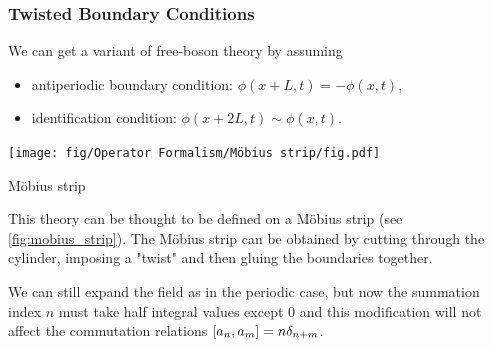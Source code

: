 \documentclass[10pt]{article}
\begin{document}
\subsubsection{Twisted Boundary Conditions}
We can get a variant of free-boson theory by assuming 
\begin{itemize}
    \item antiperiodic boundary condition: $\phi(x+L,t)=-\phi(x,t)$,
    \item identification condition: $\phi(x+2L,t)\sim\phi(x,t)$.
\end{itemize}
\begin{marginfigure}
    \centering 
    \texttt{[image: fig/Operator Formalism/Möbius strip/fig.pdf]}
    \caption{M\"obius strip}
    \label{fig:mobius_strip}
\end{marginfigure}
\begin{intu}
    This theory can be thought to be defined on a M\"obius strip (see \cref{fig:mobius_strip}).
    The M\"obius strip can be obtained by cutting through the cylinder, imposing a "twist" and then gluing the boundaries together.
\end{intu}

We can still expand the field as in the periodic case, but now the summation index $n$ must take half integral values except 0 and this modification will not affect the commutation relations $\comm{a_n}{a_m}=n\delta_{n+m}$.
\end{document}
